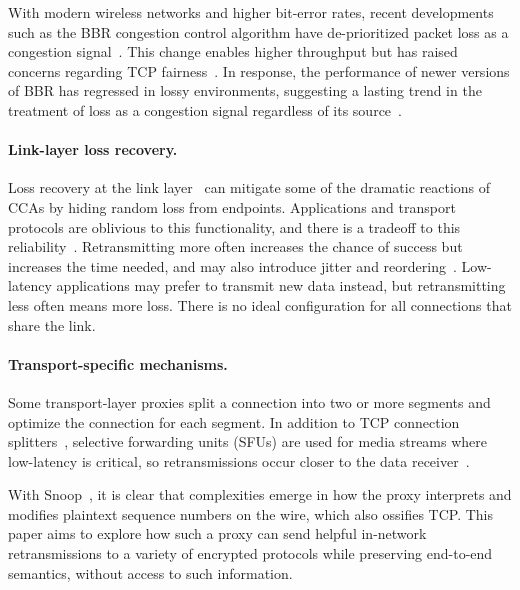 With modern wireless networks and higher bit-error rates, recent developments
such as the BBR congestion control
algorithm have de-prioritized packet loss as a congestion
signal~\cite{cardwell2017bbr}. This change enables higher throughput but has
raised concerns regarding TCP fairness~\cite
{ware2019modeling,philip2024prudentia}. In response, the performance of newer
versions of BBR has regressed in lossy environments, suggesting a lasting trend
in the treatment of loss as a congestion signal regardless of its source~\cite
{atc-submission}.

\paragraph{Link-layer loss recovery.}

Loss recovery at the link layer~\cite{3gpp5gstandard,le2022link,ieee80211e} can
mitigate some of the dramatic reactions of CCAs by hiding random loss from
endpoints.
Applications and transport protocols are oblivious to this
functionality, and there is a tradeoff to this reliability~\cite{klingler2018impact,kliazovich2012arqproxy}.
Retransmitting more often increases the chance
of success but increases the time needed, and may also introduce
jitter and reordering~\cite{leung2007overview}.
Low-latency applications may prefer to transmit new data instead, but
retransmitting less often means more loss.
There is no ideal configuration for all connections that share the link.

\paragraph{Transport-specific mechanisms.}

Some transport-layer proxies split a connection into two or more segments
and optimize the connection for each segment. In addition to
TCP connection splitters~\cite{rfc3135,honda2011still,hayes2019mmwave},
selective forwarding units (SFUs) are
used for media streams where low-latency is critical, so retransmissions occur
closer to the data receiver~\cite{rfc7667,andre2018comparative}.

With Snoop~\cite{balakrishnan1995snoop}, it is clear
that complexities emerge in how the proxy interprets
and modifies plaintext sequence numbers on the wire, which also ossifies TCP.
This paper aims to explore how such a proxy can send helpful in-network
retransmissions to a variety of encrypted protocols while preserving
end-to-end semantics, without access to such information.

